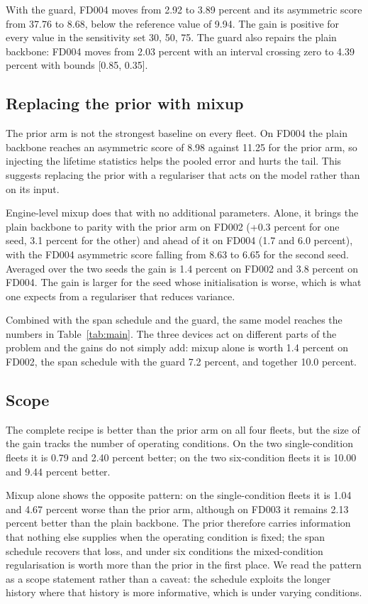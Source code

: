 \documentclass[journal]{IEEEtran}
\begin{document}
With the guard, FD004 moves from 2.92 to 3.89 percent and its asymmetric score from 37.76 to 8.68, below the reference value of 9.94. The gain is positive for every value in the sensitivity set {30, 50, 75}. The guard also repairs the plain backbone: FD004 moves from 2.03 percent with an interval crossing zero to 4.39 percent with bounds [0.85, 0.35].

\subsection{Replacing the prior with mixup}
The prior arm is not the strongest baseline on every fleet. On FD004 the plain backbone reaches an asymmetric score of 8.98 against 11.25 for the prior arm, so injecting the lifetime statistics helps the pooled error and hurts the tail. This suggests replacing the prior with a regulariser that acts on the model rather than on its input.

Engine-level mixup does that with no additional parameters. Alone, it brings the plain backbone to parity with the prior arm on FD002 (+0.3 percent for one seed, 3.1 percent for the other) and ahead of it on FD004 (1.7 and 6.0 percent), with the FD004 asymmetric score falling from 8.63 to 6.65 for the second seed. Averaged over the two seeds the gain is 1.4 percent on FD002 and 3.8 percent on FD004. The gain is larger for the seed whose initialisation is worse, which is what one expects from a regulariser that reduces variance.

Combined with the span schedule and the guard, the same model reaches the numbers in Table~\ref{tab:main}. The three devices act on different parts of the problem and the gains do not simply add: mixup alone is worth 1.4 percent on FD002, the span schedule with the guard 7.2 percent, and together 10.0 percent.

\subsection{Scope}
The complete recipe is better than the prior arm on all four fleets, but the size of the gain tracks the number of operating conditions. On the two single-condition fleets it is 0.79 and 2.40 percent better; on the two six-condition fleets it is 10.00 and 9.44 percent better.

Mixup alone shows the opposite pattern: on the single-condition fleets it is 1.04 and 4.67 percent worse than the prior arm, although on FD003 it remains 2.13 percent better than the plain backbone. The prior therefore carries information that nothing else supplies when the operating condition is fixed; the span schedule recovers that loss, and under six conditions the mixed-condition regularisation is worth more than the prior in the first place. We read the pattern as a scope statement rather than a caveat: the schedule exploits the longer history where that history is more informative, which is under varying conditions.
\end{document}
